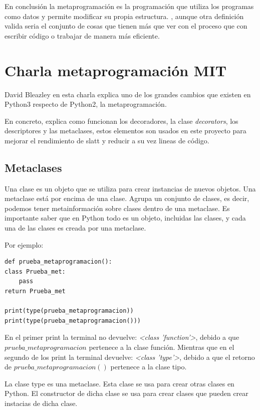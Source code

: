 \documentclass{cosas/tfg_domingo}
\begin{document}
En conclusión la metaprogramación es la programación que utiliza los programas como datos y permite modificar su propia estructura. \citep{silva2018metaprogramacion}, aunque otra definición valida seria el conjunto de cosas que tienen más que ver con el proceso que con escribir código o trabajar de manera más eficiente.
\newpage
\section{Charla metaprogramación MIT}

David Bleazley en esta charla explica uno de los grandes cambios que existen en Python3 respecto de Python2, la metaprogramación.\citep{David}

En concreto, explica como funcionan los decoradores, la clase \textit{decorators}, los descriptores y las metaclases, estos elementos son usados en este proyecto para mejorar el rendimiento de slatt y reducir a su vez lineas de código.

\subsection{Metaclases}
Una clase es un objeto que se utiliza para crear instancias de nuevos objetos.
Una metaclase está por encima de una clase. Agrupa un conjunto de clases, es decir, podemos tener metainformación sobre clases dentro de una metaclase. Es importante saber que en Python todo es un objeto, incluidas las clases, y cada una de las clases es creada por una metaclase.

\hfill

Por ejemplo:

\begin{verbatim}
def prueba_metaprogramacion():
class Prueba_met:
    pass
return Prueba_met

print(type(prueba_metaprogramacion))
print(type(prueba_metaprogramacion()))
\end{verbatim}

En el primer print la terminal no devuelve: \textit{<class 'function'>}, debido a que $prueba\_metaprogramacion$ pertenece a la clase función. Mientras que en el segundo de los print la terminal devuelve: \textit{<class 'type'>}, debido a que el retorno de $prueba\_metaprogramacion()$ pertenece a la clase tipo.

La clase type es una metaclase. Esta clase se usa para crear otras clases en Python. El constructor de dicha clase se usa para crear clases que pueden crear instacias de dicha clase.
\end{document}
